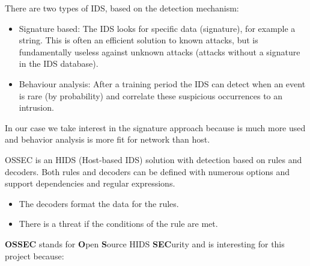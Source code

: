 \linej
There are two types of IDS, based on the detection mechanism:
\begin{itemize}
	\item Signature based: The IDS looks for specific data (signature), for example a string. This is often an efficient solution to known attacks, but is fundamentally useless against unknown attacks (attacks without a signature in the IDS database).
	\item Behaviour analysis: After a training period the IDS can detect when an event is rare (by probability) and correlate these suspicious occurrences to an intrusion.
\end{itemize}
In our case we take interest in the signature approach because is much more used and behavior analysis is more fit for network than host.

\linej
\linej
OSSEC is an HIDS (Host-based IDS) solution with detection based on rules and decoders. Both rules and decoders can be defined with numerous options and support dependencies and regular expressions.
\begin{itemize}
	\item The decoders format the data for the rules.
	\item There is a threat if the conditions of the rule are met.
\end{itemize}
\linej
\textbf{OSSEC} stands for \textbf{O}pen \textbf{S}ource HIDS \textbf{SEC}urity and is interesting for this project because\cite{ossec}\cite{wazuh_additional_functionality}:
